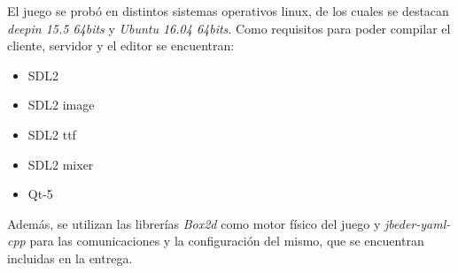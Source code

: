 El juego se probó en distintos sistemas operativos linux, de los cuales se destacan \emph{deepin 15.5 64bits} y \emph{Ubuntu 16.04 64bits}. Como requisitos para poder compilar el cliente, servidor y el editor se encuentran:

\begin{itemize}
	\item SDL2
	\item SDL2 image
	\item SDL2 ttf
	\item SDL2 mixer
	\item Qt-5
\end{itemize}

Además, se utilizan las librerías \emph{Box2d} como motor físico del juego y \emph{jbeder-yaml-cpp} para las comunicaciones y la configuración del mismo, que se encuentran incluidas en la entrega.

